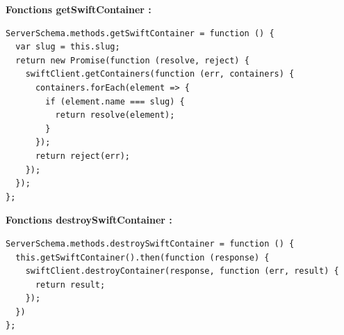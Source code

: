 \documentclass{article}
\begin{document}
\textbf{Fonctions getSwiftContainer :}
\begin{lstlisting}
ServerSchema.methods.getSwiftContainer = function () {
  var slug = this.slug;
  return new Promise(function (resolve, reject) {
    swiftClient.getContainers(function (err, containers) {
      containers.forEach(element => {
        if (element.name === slug) {
          return resolve(element);
        }
      });
      return reject(err);
    });
  });
};
\end{lstlisting}
\textbf{Fonctions destroySwiftContainer :}
\begin{lstlisting}
ServerSchema.methods.destroySwiftContainer = function () {
  this.getSwiftContainer().then(function (response) {
    swiftClient.destroyContainer(response, function (err, result) {
      return result;
    });
  })
};
\end{lstlisting}
\end{document}
